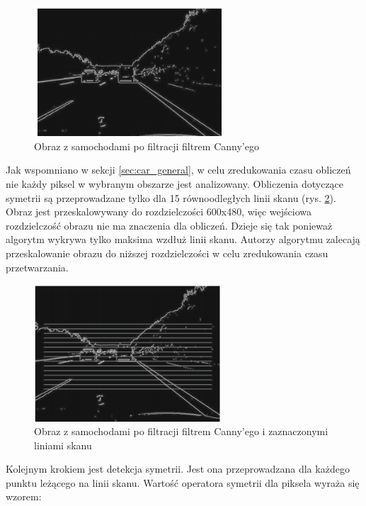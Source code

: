 \begin{figure}
  \centering
  \includegraphics[width=7cm]{img/car_canny.png}
  \caption{Obraz z samochodami po filtracji filtrem Canny'ego\cite{T1}}
  \label{fig:car_edge}
\end{figure}

Jak wspomniano w sekcji \ref{sec:car_general}, w celu zredukowania czasu obliczeń nie każdy piksel w wybranym obszarze jest analizowany. 
Obliczenia dotyczące symetrii są przeprowadzane tylko dla 15 równoodległych linii skanu (rys. \ref{fig:car_scan_lines1}). 
Obraz jest przeskalowywany do rozdzielczości 600x480, więc wejściowa rozdzielczość obrazu nie ma znaczenia dla obliczeń. %
Dzieje się tak ponieważ algorytm wykrywa tylko maksima wzdłuż linii skanu. Autorzy algorytmu zalecają przeskalowanie obrazu do niższej rozdzielczości w celu zredukowania czasu przetwarzania.

\begin{figure}
  \centering
  \includegraphics[width=7cm]{img/car_lines.png}
  \caption{Obraz z samochodami po filtracji filtrem Canny'ego i zaznaczonymi liniami skanu\cite{T1}}
  \label{fig:car_scan_lines1}
\end{figure}

Kolejnym krokiem jest detekcja symetrii. 
Jest ona przeprowadzana dla każdego punktu leżącego na linii skanu.
Wartość operatora symetrii dla piksela wyraża się wzorem:

